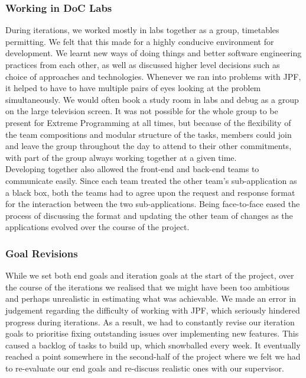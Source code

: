 \documentclass[titlepage,11pt]{article}
\begin{document}
\subsubsection{Working in DoC Labs}

During iterations, we worked mostly in labs together as a group, timetables permitting. We felt that this made for a highly conducive environment for development. We learnt new ways of doing things and better software engineering practices from each other, as well as discussed higher level decisions such as choice of approaches and technologies. Whenever we ran into problems with JPF, it helped to have to have multiple pairs of eyes looking at the problem simultaneously. We would often book a study room in labs and debug as a group on the large television screen. It was not possible for the whole group to be present for Extreme Programming at all times, but because of the flexibility of the team compositions and modular structure of the tasks, members could join and leave the group throughout the day to attend to their other commitments, with part of the group always working together at a given time.\\

Developing together also allowed the front-end and back-end teams to communicate easily. Since each team treated the other team's sub-application as a black box, both the teams had to agree upon the request and response format for the interaction between the two sub-applications. Being face-to-face eased the process of discussing the format and updating the other team of changes as the applications evolved over the course of the project.

\subsubsection{Goal Revisions}

 While we set both end goals and iteration goals at the start of the project, over the course of the iterations we realised that we might have been too ambitious and perhaps unrealistic in estimating what was achievable. We made an error in judgement regarding the difficulty of working with JPF, which seriously hindered progress during iterations. As a result, we had to constantly revise our iteration goals to prioritise fixing outstanding issues over implementing new features. This caused a backlog of tasks to build up, which snowballed every week. It eventually reached a point somewhere in the second-half of the project where we felt we had to re-evaluate our end goals and re-discuss realistic ones with our supervisor. \\
\end{document}
